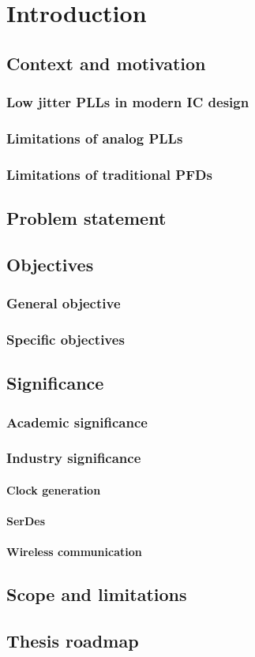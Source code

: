 \chapter{Introduction}
\section{Context and motivation}
\subsection{Low jitter PLLs in modern IC design}
\subsection{Limitations of analog PLLs}
\subsection{Limitations of traditional PFDs}

\section{Problem statement}

\section{Objectives}
\subsection{General objective}
\subsection{Specific objectives}

\section{Significance}
\subsection{Academic significance}
\subsection{Industry significance}
\subsubsection{Clock generation}
\subsubsection{SerDes}
\subsubsection{Wireless communication}

\section{Scope and limitations}

\section{Thesis roadmap}